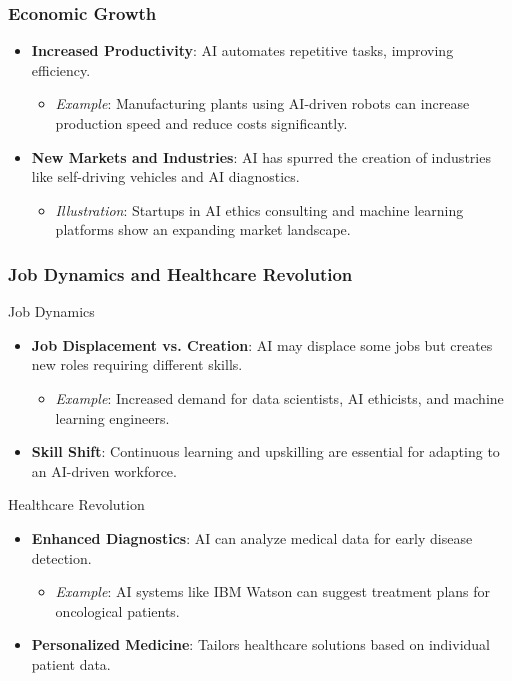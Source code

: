 \documentclass[aspectratio=169]{beamer}
\begin{document}
\begin{frame}[fragile]
    \frametitle{Economic Growth}
    \begin{itemize}
        \item \textbf{Increased Productivity}: AI automates repetitive tasks, improving efficiency.
        \begin{itemize}
            \item \textit{Example}: Manufacturing plants using AI-driven robots can increase production speed and reduce costs significantly.
        \end{itemize}
        
        \item \textbf{New Markets and Industries}: AI has spurred the creation of industries like self-driving vehicles and AI diagnostics.
        \begin{itemize}
            \item \textit{Illustration}: Startups in AI ethics consulting and machine learning platforms show an expanding market landscape.
        \end{itemize}
    \end{itemize}
\end{frame}

\begin{frame}[fragile]
    \frametitle{Job Dynamics and Healthcare Revolution}
    \begin{block}{Job Dynamics}
        \begin{itemize}
            \item \textbf{Job Displacement vs. Creation}: AI may displace some jobs but creates new roles requiring different skills.
            \begin{itemize}
                \item \textit{Example}: Increased demand for data scientists, AI ethicists, and machine learning engineers.
            \end{itemize}
            \item \textbf{Skill Shift}: Continuous learning and upskilling are essential for adapting to an AI-driven workforce.
        \end{itemize}
    \end{block}

    \begin{block}{Healthcare Revolution}
        \begin{itemize}
            \item \textbf{Enhanced Diagnostics}: AI can analyze medical data for early disease detection.
            \begin{itemize}
                \item \textit{Example}: AI systems like IBM Watson can suggest treatment plans for oncological patients.
            \end{itemize}

            \item \textbf{Personalized Medicine}: Tailors healthcare solutions based on individual patient data.
        \end{itemize}
    \end{block}
\end{frame}
\end{document}
